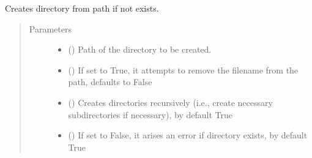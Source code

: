 \documentclass[letterpaper,10pt,english]{sphinxmanual}
\begin{document}
\begin{fulllineitems}
\label{\detokenize{code:utils.makedir}}
\sphinxAtStartPar
Creates directory from path if not exists.
\begin{quote}\begin{description}
\item[{Parameters}] \leavevmode\begin{itemize}
\item {} 
\sphinxAtStartPar
{} (\sphinxstyleliteralemphasis{\sphinxupquote{{[}}}\sphinxstyleliteralemphasis{\sphinxupquote{,}}\sphinxstyleliteralemphasis{\sphinxupquote{{]}}}) \textendash{} Path of the directory to be created.

\item {} 
\sphinxAtStartPar
{} (\sphinxstyleliteralemphasis{\sphinxupquote{, }}) \textendash{} If set to True, it attempts to remove the filename from the path, defaults
to False

\item {} 
\sphinxAtStartPar
{} (\sphinxstyleliteralemphasis{\sphinxupquote{, }}) \textendash{} Creates directories recursively (i.e., create necessary subdirectories if
necessary), by default True

\item {} 
\sphinxAtStartPar
{} (\sphinxstyleliteralemphasis{\sphinxupquote{, }}) \textendash{} If set to False, it arises an error if  directory exists, by default True

\end{itemize}

\end{description}\end{quote}

\end{fulllineitems}
\end{document}

